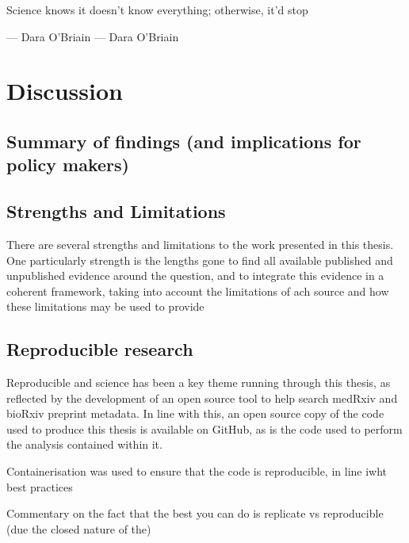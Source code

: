 \documentclass[a4paper, twoside]{templates/ociamthesis}
\begin{document}
\begin{savequote}
Science knows it doesn't know everything; otherwise, it'd stop
\end{savequote}

--- Dara O'Briain --- Dara O'Briain

\hypertarget{discussion-1}{%
\chapter{Discussion}\label{discussion-1}}

\hypertarget{summary-of-findings-and-implications-for-policy-makers}{%
\section{Summary of findings (and implications for policy makers)}\label{summary-of-findings-and-implications-for-policy-makers}}

\hypertarget{strengths-and-limitations}{%
\section{Strengths and Limitations}\label{strengths-and-limitations}}

There are several strengths and limitations to the work presented in this thesis. One particularly strength is the lengths gone to find all available published and unpublished evidence around the question, and to integrate this evidence in a coherent framework, taking into account the limitations of ach source and how these limitations may be used to provide

\hypertarget{reproducible-research}{%
\section{Reproducible research}\label{reproducible-research}}

Reproducible and science has been a key theme running through this thesis, as reflected by the development of an open source tool to help search medRxiv and bioRxiv preprint metadata. In line with this, an open source copy of the code used to produce this thesis is available on GitHub, as is the code used to perform the analysis contained within it.

Containerisation was used to ensure that the code is reproducible, in line iwht best practices

Commentary on the fact that the best you can do is replicate vs reproducible (due the closed nature of the)
\end{document}
